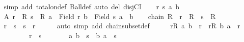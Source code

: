\begin{isabellebody}
%
\isatagproof
{}\isamarkupfalse%
\ {\isacharparenleft}{\kern0pt}simp\ add{\isacharcolon}{\kern0pt}\ total{\isacharunderscore}{\kern0pt}on{\isacharunderscore}{\kern0pt}def\ Ball{\isacharunderscore}{\kern0pt}def{\isacharcomma}{\kern0pt}\ auto\ del{\isacharcolon}{\kern0pt}\ disjCI{\isacharparenright}{\kern0pt}\isanewline
\ \ \isamarkupfalse%
\ r\ s\ a\ b\isanewline
\ \ \isamarkupfalse%
\ A{\isacharcolon}{\kern0pt}\ {\isachardoublequoteopen}r\ {\isasymin}\ R{\isachardoublequoteclose}\ {\isachardoublequoteopen}s\ {\isasymin}\ R{\isachardoublequoteclose}\ {\isachardoublequoteopen}a\ {\isasymin}\ Field\ r{\isachardoublequoteclose}\ {\isachardoublequoteopen}b\ {\isasymin}\ Field\ s{\isachardoublequoteclose}\ {\isachardoublequoteopen}a\ {\isasymnoteq}\ b{\isachardoublequoteclose}\isanewline
\ \ \isamarkupfalse%
\ {\isacartoucheopen}chain\isactrlsub {\isasymsubseteq}\ R{\isacartoucheclose}\ \ {\isacartoucheopen}r\ {\isasymin}\ R{\isacartoucheclose}\ \ {\isacartoucheopen}s\ {\isasymin}\ R{\isacartoucheclose}\ \isamarkupfalse%
\ {\isachardoublequoteopen}r\ {\isasymsubseteq}\ s\ {\isasymor}\ s\ {\isasymsubseteq}\ r{\isachardoublequoteclose}\isanewline
\ \ \ \ \isamarkupfalse%
\ {\isacharparenleft}{\kern0pt}auto\ simp\ add{\isacharcolon}{\kern0pt}\ chain{\isacharunderscore}{\kern0pt}subset{\isacharunderscore}{\kern0pt}def{\isacharparenright}{\kern0pt}\isanewline
\ \ \isamarkupfalse%
\ \isamarkupfalse%
\ {\isachardoublequoteopen}{\isacharparenleft}{\kern0pt}{\isasymexists}r{\isasymin}R{\isachardot}{\kern0pt}\ {\isacharparenleft}{\kern0pt}a{\isacharcomma}{\kern0pt}\ b{\isacharparenright}{\kern0pt}\ {\isasymin}\ r{\isacharparenright}{\kern0pt}\ {\isasymor}\ {\isacharparenleft}{\kern0pt}{\isasymexists}r{\isasymin}R{\isachardot}{\kern0pt}\ {\isacharparenleft}{\kern0pt}b{\isacharcomma}{\kern0pt}\ a{\isacharparenright}{\kern0pt}\ {\isasymin}\ r{\isacharparenright}{\kern0pt}{\isachardoublequoteclose}\isanewline
\ \ \isamarkupfalse%
\isanewline
\ \ \ \ \isamarkupfalse%
\ {\isachardoublequoteopen}r\ {\isasymsubseteq}\ s{\isachardoublequoteclose}\isanewline
\ \ \ \ \isamarkupfalse%
\ \isamarkupfalse%
\ {\isachardoublequoteopen}{\isacharparenleft}{\kern0pt}a{\isacharcomma}{\kern0pt}\ b{\isacharparenright}{\kern0pt}\ {\isasymin}\ s\ {\isasymor}\ {\isacharparenleft}{\kern0pt}b{\isacharcomma}{\kern0pt}\ a{\isacharparenright}{\kern0pt}\ {\isasymin}\ s{\isachardoublequoteclose}\isanewline

\end{isabellebody}

